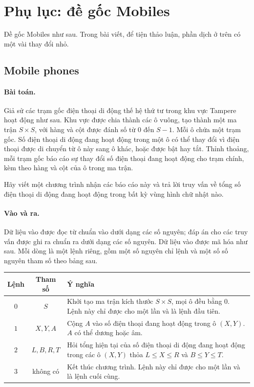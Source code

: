 \documentclass[11pt]{article}
\begin{document}
\appendix
\section{Phụ lục: đề gốc Mobiles}

Đề gốc Mobiles như sau. Trong bài viết, để tiện thảo luận, phần dịch ở trên
có một vài thay đổi nhỏ.

\subsection*{Mobile phones}

\paragraph{Bài toán.}
Giả sử các trạm gốc điện thoại di động thế hệ thứ tư trong khu vực Tampere
hoạt động như sau. Khu vực được chia thành các ô vuông, tạo thành một ma trận
\(S\times S\), với hàng và cột được đánh số từ \(0\) đến \(S-1\). Mỗi ô chứa
một trạm gốc. Số điện thoại di động đang hoạt động trong một ô có thể thay
đổi vì điện thoại được di chuyển từ ô này sang ô khác, hoặc được bật hay tắt.
Thỉnh thoảng, mỗi trạm gốc báo cáo sự thay đổi số điện thoại đang hoạt động
cho trạm chính, kèm theo hàng và cột của ô trong ma trận.

Hãy viết một chương trình nhận các báo cáo này và trả lời truy vấn về tổng số
điện thoại di động đang hoạt động trong bất kỳ vùng hình chữ nhật nào.

\paragraph{Vào và ra.}
Dữ liệu vào được đọc từ chuẩn vào dưới dạng các số nguyên; đáp án cho các
truy vấn được ghi ra chuẩn ra dưới dạng các số nguyên. Dữ liệu vào được mã hóa
như sau. Mỗi dòng là một lệnh riêng, gồm một số nguyên chỉ lệnh và một số số
nguyên tham số theo bảng sau.

\begin{center}
\begin{tabular}{c|c|p{}}
\hline
Lệnh & Tham số & Ý nghĩa \\
\hline
\(0\) & \(S\) &
Khởi tạo ma trận kích thước \(S\times S\), mọi ô đều bằng \(0\). Lệnh này chỉ
được cho một lần và là lệnh đầu tiên. \\
\(1\) & \(X,Y,A\) &
Cộng \(A\) vào số điện thoại đang hoạt động trong ô \((X,Y)\). \(A\) có thể
dương hoặc âm. \\
\(2\) & \(L,B,R,T\) &
Hỏi tổng hiện tại của số điện thoại di động đang hoạt động trong các ô
\((X,Y)\) thỏa \(L\le X\le R\) và \(B\le Y\le T\). \\
\(3\) & không có &
Kết thúc chương trình. Lệnh này chỉ được cho một lần và là lệnh cuối cùng. \\
\hline
\end{tabular}
\end{center}
\end{document}
